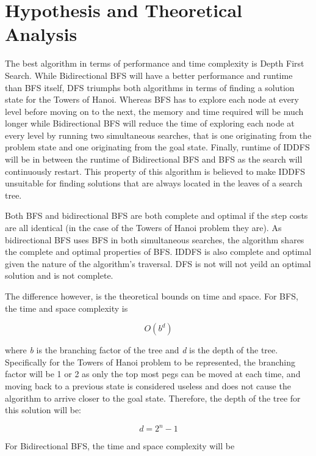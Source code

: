 \documentclass[conference]{IEEEtran}
\begin{document}
\section{Hypothesis and Theoretical Analysis}

The best algorithm in terms of performance and time complexity is Depth First Search. While Bidirectional BFS will have a better performance and runtime than BFS itself, DFS triumphs both algorithms in terms of finding a solution state for the Towers of Hanoi. Whereas BFS has to explore each node at every level before moving on to the next, the memory and time required will be much longer while Bidirectional BFS will reduce the time of exploring each node at every level by running two simultaneous searches, that is one originating from the problem state and one originating from the goal state. Finally, runtime of IDDFS will be in between the runtime of Bidirectional BFS and BFS  as the search will continuously restart. This property of this algorithm is believed to make IDDFS unsuitable for finding solutions that are always located in the leaves of a search tree.

Both BFS and bidirectional BFS are both complete and optimal if the step costs are all identical (in the case of the Towers of Hanoi problem they are). As bidirectional BFS uses BFS in both simultaneous searches, the algorithm shares the complete and optimal properties of BFS. IDDFS is also complete and optimal given the nature of the algorithm's traversal. DFS is not will not yeild an optimal solution and is not complete.  

The difference however, is the theoretical bounds on time and space. For BFS, the time and space complexity is 

\begin{equation}
 O(b^d)
\end{equation}

where \textit{b} is the branching factor of the tree and \textit{d} is the depth of the tree. Specifically for the Towers of Hanoi problem to be represented, the branching factor will be 1 or 2 as only the top most pegs can be moved at each time, and moving back to a previous state is considered useless and does not cause the algorithm to arrive closer to the goal state. Therefore, the depth of the tree for this solution will be:

\begin{equation}
d = 2^n - 1
\end{equation}

For Bidirectional BFS, the time and space complexity will be 
\end{document}
